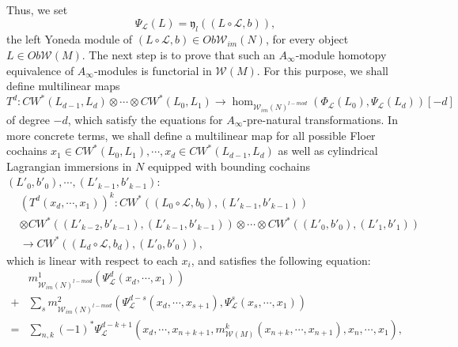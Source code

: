 \documentclass{amsart}
\numberwithin{equation}{section}
\numberwithin{figure}{section}
\begin{document}
	Thus, we set
\begin{equation}
\Psi_{\mathcal{L}}(L) = \mathfrak{y}_{l}((L \circ \mathcal{L}, b)),
\end{equation}
the left Yoneda module of $(L \circ \mathcal{L}, b) \in Ob \mathcal{W}_{im}(N)$, for every object $L \in Ob \mathcal{W}(M)$.
	The next step is to prove that such an $A_{\infty}$-module homotopy equivalence of $A_{\infty}$-modules is functorial in $\mathcal{W}(M)$. For this purpose, we shall define multilinear maps
\begin{equation}
T^{d}: CW^{*}(L_{d-1}, L_{d}) \otimes \cdots \otimes CW^{*}(L_{0}, L_{1}) \to \hom_{\mathcal{W}_{im}(N)^{l-mod}}(\Phi_{\mathcal{L}}(L_{0}), \Psi_{\mathcal{L}}(L_{d}))[-d]
\end{equation}
of degree $-d$, which satisfy the equations for $A_{\infty}$-pre-natural transformations.
In more concrete terms, we shall define a multilinear map for all possible Floer cochains $x_{1} \in CW^{*}(L_{0}, L_{1}), \cdots, x_{d} \in CW^{*}(L_{d-1}, L_{d})$ as well as cylindrical Lagrangian immersions in $N$ equipped with bounding cochains $(L'_{0}, b'_{0}), \cdots, (L'_{k-1}, b'_{k-1})$:
\begin{equation}
\begin{split}
&(T^{d}(x_{d}, \cdots, x_{1}))^{k}: CW^{*}((L_{0} \circ \mathcal{L}, b_{0}), (L'_{k-1}, b'_{k-1}))\\
& \otimes CW^{*}((L'_{k-2}, b'_{k-1}), (L'_{k-1}, b'_{k-1}))
\otimes \cdots \otimes CW^{*}((L'_{0}, b'_{0}), (L'_{1}, b'_{1}))\\
&\to CW^{*}((L_{d} \circ \mathcal{L}, b_{d}), (L'_{0}, b'_{0})),
\end{split}
\end{equation}
which is linear with respect to each $x_{i}$, and satisfies the following equation:
\begin{equation} \label{A-infinity equation for the new module-valued functor}
\begin{split}
&m^{1}_{\mathcal{W}_{im}(N)^{l-mod}}(\Psi_{\mathcal{L}}^{d}(x_{d}, \cdots, x_{1}))\\
+ &\sum_{s} m^{2}_{\mathcal{W}_{im}(N)^{l-mod}}(\Psi_{\mathcal{L}}^{d-s}(x_{d}, \cdots, x_{s+1}), \Psi_{\mathcal{L}}^{s}(x_{s}, \cdots, x_{1}))\\
= &\sum_{n, k} (-1)^{*} \Psi_{\mathcal{L}}^{d-k+1}(x_{d}, \cdots, x_{n+k+1}, m^{k}_{\mathcal{W}(M)}(x_{n+k}, \cdots, x_{n+1}), x_{n}, \cdots, x_{1}),
\end{split}
\end{equation}
\end{document}
